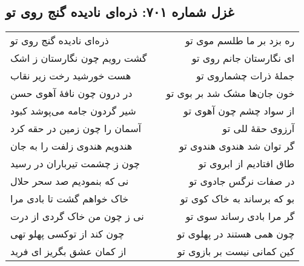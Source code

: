 \begin{center}
\section*{غزل شماره ۷۰۱: ذره‌ای نادیده گنج روی تو}
\label{sec:701}
\begin{longtable}{l p{0.5cm} r}
ذره‌ای نادیده گنج روی تو
&&
ره بزد بر ما طلسم موی تو
\\
گشت رویم چون نگارستان ز اشک
&&
ای نگارستان جانم روی تو
\\
هست خورشید رخت زیر نقاب
&&
جملهٔ ذرات چشماروی تو
\\
در درون چون نافهٔ آهوی حسن
&&
خون جان‌ها مشک شد بر بوی تو
\\
شیر گردون جامه می‌پوشد کبود
&&
از سواد چشم چون آهوی تو
\\
آسمان را چون زمین در حقه کرد
&&
آرزوی حقهٔ للی تو
\\
هندویم هندوی زلفت را به جان
&&
گر توان شد هندوی هندوی تو
\\
چون ز چشمت تیرباران در رسید
&&
طاق افتادیم از ابروی تو
\\
نی که بنمودیم صد سحر حلال
&&
در صفات نرگس جادوی تو
\\
خاک خواهم گشت تا بادی مرا
&&
بو که برساند به خاک کوی تو
\\
نی ز چون من خاک گردی از درت
&&
گر مرا بادی رساند سوی تو
\\
چون کند از توکسی پهلو تهی
&&
چون همی هستند در پهلوی تو
\\
از کمان عشق بگریز ای فرید
&&
کین کمانی نیست بر بازوی تو
\\
\end{longtable}
\end{center}
